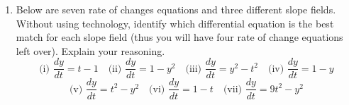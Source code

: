 \begin{enumerate}
\item Below are seven rate of changes equations and three different slope fields. Without using technology, identify which differential equation is the best match for each slope field (thus you will have four rate of change equations left over). Explain your reasoning. \label{01problem8}
\[
\text{(i) } \frac{dy}{dt}=t-1 \quad \text{(ii) } \frac{dy}{dt}=1-y^2 \quad \text{(iii) } \frac{dy}{dt}=y^2-t^2 \quad \text{(iv) } \frac{dy}{dt}=1-y
\]
\[
\text{(v) } \frac{dy}{dt}=t^2-y^2 \quad \text{(vi) } \frac{dy}{dt}=1-t \quad \text{(vii) } \frac{dy}{dt}=9t^2-y^2
\]


\end{enumerate}
